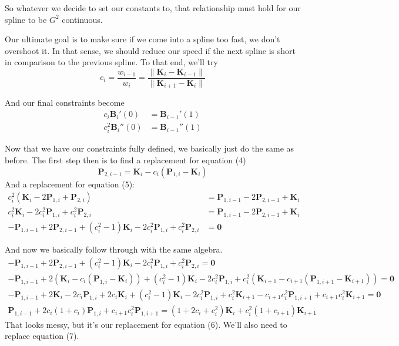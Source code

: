 \documentclass[10pt]{article}
\renewcommand{\vec}[1]{\mathbf{#1}}
\newcommand{\norm}[1]{\lVert#1\rVert}
\begin{document}
	So whatever we decide to set our constants to, that relationship must hold
	for our spline to be $G^{2}$ continuous.

	Our ultimate goal is to make sure if we come into a spline too fast, we
	don't overshoot it. In that sense, we should reduce our speed if the next
	spline is short in comparison to the previous spline. To that end, we'll try
	$$c_{i} = \frac{w_{i-1}}{w_{i}} = \frac{\norm{\vec{K}_{i}-\vec{K}_{i-1}}}{\norm{\vec{K}_{i+1}-\vec{K}_{i}}}$$

	And our final constraints become
	\begin{align*}
		c_{i}\vec{B}_{i}'(0) &= \vec{B}_{i-1}'(1)\nonumber\\
		c_{i}^{2}\vec{B}_{i}''(0) &= \vec{B}_{i-1}''(1)\nonumber
	\end{align*}

	Now that we have our constraints fully defined, we basically just do the
	same as before. The first step then is to find a replacement for equation (4)
	\begin{equation}
		\vec{P}_{2,i-1}=\vec{K}_{i}-c_{i}(\vec{P}_{1,i}-\vec{K}_{i})
	\end{equation}
	And a replacement for equation (5):
	\begin{align}
		c_{i}^{2}(\vec{K}_{i} - 2\vec{P}_{1,i} + \vec{P}_{2,i}) &= \vec{P}_{1,i-1} - 2\vec{P}_{2,i-1} + \vec{K}_{i}\nonumber\\
		c_{i}^{2}\vec{K}_{i} - 2c_{i}^{2}\vec{P}_{1,i} + c_{i}^{2}\vec{P}_{2,i} &= \vec{P}_{1,i-1} - 2\vec{P}_{2,i-1} + \vec{K}_{i}\nonumber\\
		-\vec{P}_{1,i-1} + 2\vec{P}_{2,i-1} + (c_{i}^{2} - 1)\vec{K}_{i} - 2c_{i}^{2}\vec{P}_{1,i} + c_{i}^{2}\vec{P}_{2,i} &= \vec{0}
	\end{align}

	And now we basically follow through with the same algebra.
	\begin{gather}
		-\vec{P}_{1,i-1}+2\vec{P}_{2,i-1}+(c_{i}^{2}-1)\vec{K}_{i}-2c_{i}^{2}\vec{P}_{1,i}+c_{i}^{2}\vec{P}_{2,i} = \vec{0}\nonumber\\
		-\vec{P}_{1,i-1}+2(\vec{K}_{i}-c_{i}(\vec{P}_{1,i}-\vec{K}_{i}))+(c_{i}^{2}-1)\vec{K}_{i}-2c_{i}^{2}\vec{P}_{1,i}+c_{i}^{2}(\vec{K}_{i+1}-c_{i+1}(\vec{P}_{1,i+1}-\vec{K}_{i+1})) = \vec{0}\nonumber\\
		-\vec{P}_{1,i-1}+2\vec{K}_{i}-2c_{i}\vec{P}_{1,i}+2c_{i}\vec{K}_{i}+(c_{i}^{2}-1)\vec{K}_{i}-2c_{i}^{2}\vec{P}_{1,i}+c_{i}^{2}\vec{K}_{i+1}-c_{i+1}c_{i}^{2}\vec{P}_{1,i+1}+c_{i+1}c_{i}^{2}\vec{K}_{i+1} = \vec{0}\nonumber\\
		\vec{P}_{1,i-1}+2c_{i}(1+c_{i})\vec{P}_{1,i}+c_{i+1}c_{i}^{2}\vec{P}_{1,i+1} = (1+2c_{i}+c_{i}^{2})\vec{K}_{i}+c_{i}^{2}(1+c_{i+1})\vec{K}_{i+1}
	\end{gather}
	That looks messy, but it's our replacement for equation (6). We'll also need
	to replace equation (7).
	
\end{document}
